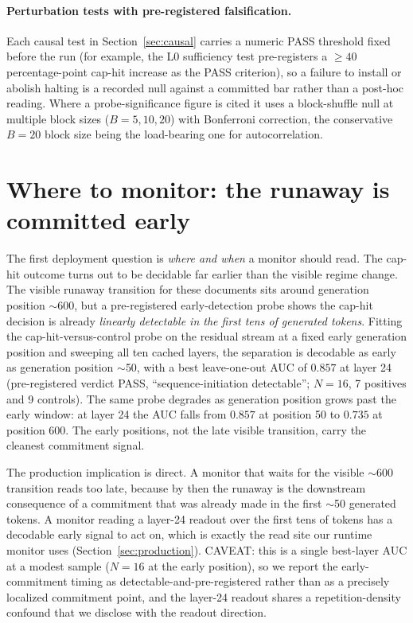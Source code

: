 \documentclass[11pt]{article}
\begin{document}
\paragraph{Perturbation tests with pre-registered falsification.}
Each causal test in Section~\ref{sec:causal} carries a numeric PASS threshold fixed
before the run (for example, the L0 sufficiency test pre-registers a $\geq 40$
percentage-point cap-hit increase as the PASS criterion), so a failure to install or
abolish halting is a recorded null against a committed bar rather than a post-hoc reading.
Where a probe-significance figure is cited it uses a block-shuffle null at multiple block
sizes ($B = 5, 10, 20$) with Bonferroni correction, the conservative $B = 20$ block size
being the load-bearing one for autocorrelation.

\section{Where to monitor: the runaway is committed early}
\label{sec:early_commitment}

The first deployment question is \emph{where and when} a monitor should read. The cap-hit
outcome turns out to be decidable far earlier than the visible regime change. The visible
runaway transition for these documents sits around generation position $\sim$600, but a
pre-registered early-detection probe shows the cap-hit decision is already
\emph{linearly detectable in the first tens of generated tokens}. Fitting the
cap-hit-versus-control probe on the residual stream at a fixed early generation position
and sweeping all ten cached layers, the separation is decodable as early as generation
position $\sim$50, with a best leave-one-out AUC of $0.857$ at layer 24 (pre-registered
verdict PASS, ``sequence-initiation detectable''; $N=16$, 7 positives and 9 controls). The
same probe degrades as generation position grows past the early window: at layer 24 the
AUC falls from $0.857$ at position 50 to $0.735$ at position 600. The early positions, not
the late visible transition, carry the cleanest commitment signal.

The production implication is direct. A monitor that waits for the visible $\sim$600
transition reads too late, because by then the runaway is the downstream consequence of a
commitment that was already made in the first $\sim$50 generated tokens. A monitor reading
a layer-24 readout over the first tens of tokens has a decodable early signal to act on,
which is exactly the read site our runtime monitor uses (Section~\ref{sec:production}).
CAVEAT: this is a single best-layer AUC at a modest sample ($N=16$ at the early position),
so we report the early-commitment timing as detectable-and-pre-registered rather than as a
precisely localized commitment point, and the layer-24 readout shares a
repetition-density confound that we disclose with the readout direction.
\end{document}
